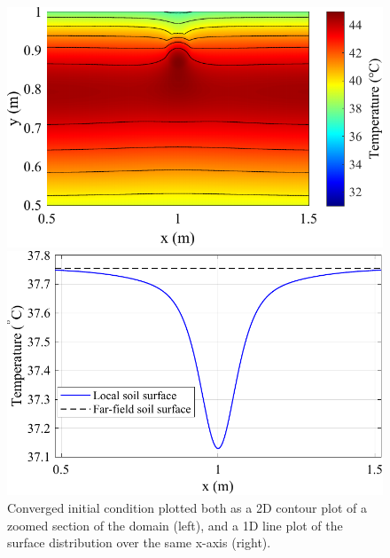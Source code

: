         \begin{figure}[htbp]
            \centering
            \begin{minipage}[b]{0.48\textwidth} %
                \includegraphics[width=\textwidth]{figs/Rory/A_temp_distribution.pdf}
            \end{minipage}
            \hfill %
            \begin{minipage}[b]{0.48\textwidth} %
                \includegraphics[width=\textwidth]{figs/Rory/1D_distribution_cropped.pdf}
            \end{minipage}
            \caption[Converged initial condition]{Converged initial condition plotted both as a 2D contour plot of a zoomed section of the domain (left), and a 1D line plot of the surface distribution over the same x-axis (right).}
            \label{fig:combined_thermal} %
        \end{figure}
    
